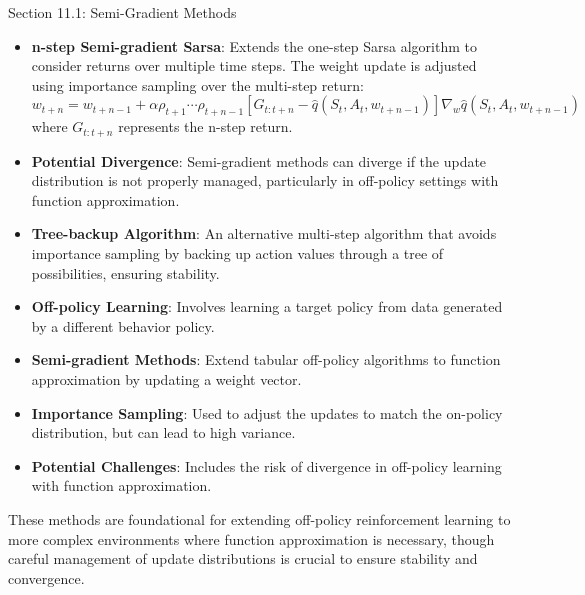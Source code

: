 \begin{notes}{Section 11.1: Semi-Gradient Methods}
    \begin{highlight}
    
        \begin{itemize}
            \item \textbf{n-step Semi-gradient Sarsa}: Extends the one-step Sarsa algorithm to consider returns over multiple time steps. The weight update is adjusted using importance sampling over 
            the multi-step return:
            \[
            w_{t+n} = w_{t+n-1} + \alpha \rho_{t+1} \cdots \rho_{t+n-1} [G_{t:t+n} - \hat{q}(S_t, A_t, w_{t+n-1})] \nabla_w \hat{q}(S_t, A_t, w_{t+n-1})
            \]
            where $G_{t:t+n}$ represents the n-step return.
            \item \textbf{Potential Divergence}: Semi-gradient methods can diverge if the update distribution is not properly managed, particularly in off-policy settings with function approximation.
            \item \textbf{Tree-backup Algorithm}: An alternative multi-step algorithm that avoids importance sampling by backing up action values through a tree of possibilities, ensuring stability.
        \end{itemize}
    
    \end{highlight}
    
    \begin{highlight}
    
        \begin{itemize}
            \item \textbf{Off-policy Learning}: Involves learning a target policy from data generated by a different behavior policy.
            \item \textbf{Semi-gradient Methods}: Extend tabular off-policy algorithms to function approximation by updating a weight vector.
            \item \textbf{Importance Sampling}: Used to adjust the updates to match the on-policy distribution, but can lead to high variance.
            \item \textbf{Potential Challenges}: Includes the risk of divergence in off-policy learning with function approximation.
        \end{itemize}
    
        These methods are foundational for extending off-policy reinforcement learning to more complex environments where function approximation is necessary, though careful management of update 
        distributions is crucial to ensure stability and convergence.
    
    \end{highlight}
\end{notes}

